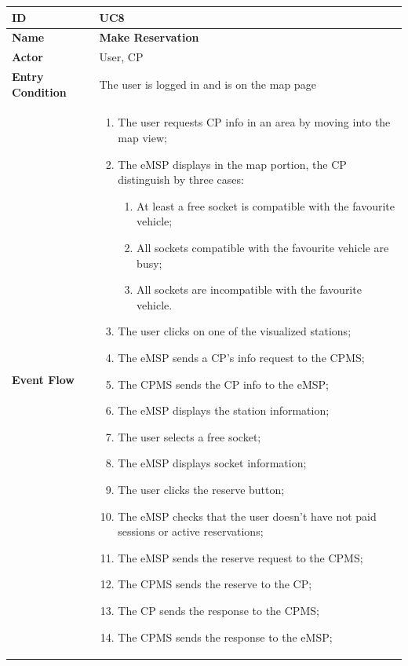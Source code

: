 \documentclass{Configuration_Files/PoliMi3i_thesis}
\begin{document}
\begin{table}[H]
    \begin{xltabular}{\textwidth}{| >{}l | X |}
    \hline
    \textbf{ID} & \textbf{UC8}\T\B\\
    \hline
    \textbf{Name} & \textbf{Make Reservation}\T\B\\
    \hline \hline
    \textbf{Actor} & User, CP\T\B \\
    \hline
    \textbf{Entry Condition} & The user is logged in and is on the map page\T\B\\
    \hline
    \textbf{Event Flow} & 
        \begin{enumerate}
        \item The user requests CP info in an area by moving into the map view;
        \item The eMSP displays in the map portion, the CP distinguish by three cases:
        \begin{enumerate}
            \item At least a free socket is compatible with the favourite vehicle;
            \item All sockets compatible with the favourite vehicle are busy;
            \item All sockets are incompatible with the favourite vehicle.
        \end{enumerate}
        \item The user clicks on one of the visualized stations;
        \item The eMSP sends a CP’s info request to the CPMS;
        \item The CPMS sends the CP info to the eMSP;
        \item The eMSP displays the station information;
        \item The user selects a free socket;
        \item The eMSP displays socket information;
        \item The user clicks the reserve button;
        \item The eMSP checks that the user doesn’t have not paid sessions or active reservations;
        \item The eMSP sends the reserve request to the CPMS;
        \item The CPMS sends the reserve to the CP;
        \item The CP sends the response to the CPMS;
        \item The CPMS sends the response to the eMSP;

\end{enumerate}
\end{xltabular}
\end{table}
\end{document}
